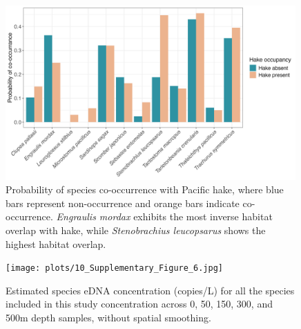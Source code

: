 \documentclass{article}
\begin{document}
\begin{figure}
\centering
\includegraphics[width=0.99\textwidth]{plots/8_Supplementary_Figure_4.jpg}
\caption{Probability of species co-occurrence with Pacific hake, where blue bars represent non-occurrence and orange bars indicate co-occurrence. \textit{Engraulis mordax} exhibits the most inverse habitat overlap with hake, while \textit{Stenobrachius leucopsarus} shows the highest habitat overlap.}
\end{figure}

\begin{figure}
\centering
\texttt{[image: plots/10\_Supplementary\_Figure\_6.jpg]}
\caption{Estimated species eDNA concentration (copies/L) for all the species included in this study concentration across 0, 50, 150, 300, and 500m depth samples, without spatial smoothing.}
\end{figure}
\end{document}

